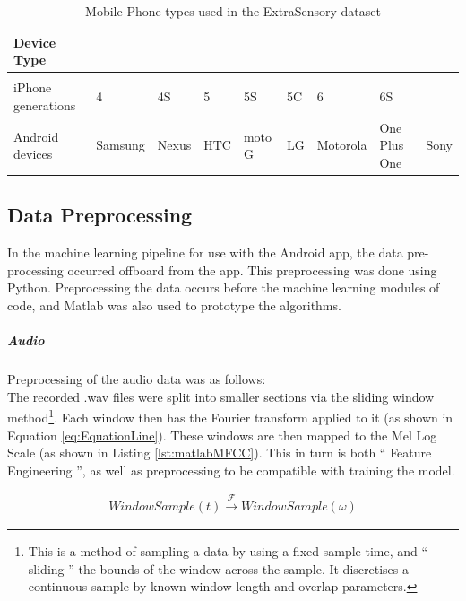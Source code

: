 \documentclass{UoNMCHA}
\newcommand{\inlineQuote}[1]{`` #1 ''}
\newcommand{\lref}[1] {Listing \ref{#1}}
\newcommand{\eref}[1] {Equation \ref{#1}}
\numberwithin{equation}{section}
\begin{document}
\begin{table}[]    
    \begin{center}
        \caption{Mobile Phone types used in the ExtraSensory dataset}\label{tab:ExtraSensoryPhones}
        \begin{tabular}{lllllllll}
            \hline \hline 
            Device Type         &         &        &    &         &    &         &              &      \\
            \hline                                                                                     \\
            iPhone generations  & 4       & 4S    & 5   & 5S     & 5C & 6        & 6S           &      \\
            Android devices     & Samsung & Nexus & HTC & moto G & LG & Motorola & One Plus One & Sony \\
            \hline 
        \end{tabular}
    \end{center}
\end{table}

\subsection{Data Preprocessing}
In the machine learning pipeline for use with the Android app, the data pre-processing occurred offboard from the app. This preprocessing was done using Python. Preprocessing the data occurs before the machine learning modules of code, and Matlab was also used to prototype the algorithms.

\subparagraph{Audio}
Preprocessing of the audio data was as follows:\\
The recorded .wav files were split into smaller sections via the sliding window method\footnote{This is a method of sampling a data by using a fixed sample time, and \inlineQuote{sliding} the bounds of the window across the sample. It discretises a continuous sample by known window length and overlap parameters.}. Each window then has the Fourier transform applied to it (as shown in \eref{eq:EquationLine}). These windows are then mapped to the Mel Log Scale (as shown in \lref{lst:matlabMFCC}). This in turn is both \inlineQuote{Feature Engineering}, as well as preprocessing to be compatible with training the model. 

\begin{gather}\label{eq:EquationLine}
    WindowSample(t) \xrightarrow{\mathscr{F}}  WindowSample(\omega)
\end{gather}
\end{document}
